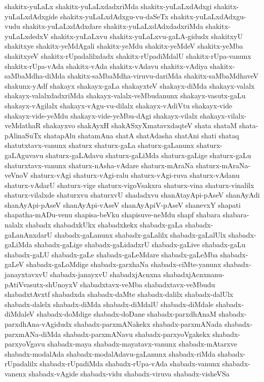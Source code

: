 {shakitx-yuLaLx
shakitx-yuLaLxdadxriMda
shakitx-yuLaLxdAdxgi
shakitx-yuLaLxdAdxgide
shakitx-yuLaLxdAdxgu-vu-daSeTx
shakitx-yuLaLxdAdxgu-vudu
shakitx-yuLaLxdAdxdare
shakitx-yuLaLxdAdxdadxriMda
shakitx-yuLaLxdedxV
shakitx-yuLaLxvu
shakitx-yuLaLxvu-gaLA-gidudx
shakitxyU
shakitxye
shakitx-yeMdAgali
shakitx-yeMdu
shakitx-yeMdeV
shakitx-yeMba
shakitxyeV
shakitx-rUpadalilxdadx
shakitx-rUpadiMdalU
shakitx-rUpa-vanunx
shakitx-rUpa-vAda
shakitx-vAda
shakitx-vAdavu
shakitx-vAdiya
shakitx-saMbaMdha-diMda
shakitx-saMbaMdha-viruvu-dariMda
shakitx-saMbaMdhaveV
shakunx-yAdf
shakayx
shakayx-gaLa
shakayxteV
shakayx-diMda
shakayx-valalx
shakayx-valalxdadxriMda
shakayx-valalx-veMbudanunx
shakayx-vasutx-gaLu
shakayx-vAgilalx
shakayx-vAgu-vu-dilalx
shakayx-vAdiVtu
shakayx-vide
shakayx-vide-yeMdu
shakayx-vide-yeMbu-dAgi
shakayx-vilalx
shakayx-vilalx-veMdathaR
shakayxvo
shakAyxH
shakASxyXmatavxdaqteV
shata
shataM
shata-pAlinaSuTx
shatapAlu
shatamAna
shatA
shatAdasha
shatAni
shati
shataq
shatutxtavx-vanunx
shaturx
shaturx-gaLa
shaturx-gaLanunx
shaturx-gaLAguvavu
shaturx-gaLAdavu
shaturx-gaLiMda
shaturx-gaLige
shaturx-gaLu
shaturxtavx-vanunx
shaturx-nAsha-vAdare
shaturx-mAraNa
shaturx-mAraNa-veVnoV
shaturx-vAgi
shaturx-vAgi-ralu
shaturx-vAgi-ruva
shaturx-vAdanu
shaturx-vAdarU
shaturx-vige
shaturx-vigoVsakxra
shaturx-vina
shaturx-vinalilx
shaturx-vilalxde
shaturxvu
shaturxvU
shadadxvu
shanAtayApi-pAseV
shanAyAdi
shanAyApi-pAseV
shanAyApi-vAseV
shanAyApiV-pAseV
shanevxY
shapati
shapatha-mADu-venu
shapisa-beVku
shapisuve-neMdu
shapf
shabara
shabara-nalalx
shabadx
shabadxkUkx
shabadxkekx
shabadx-gaLa
shabadx-gaLanAnxdarU
shabadx-gaLanunx
shabadx-gaLalilx
shabadx-gaLalUlx
shabadx-gaLiMda
shabadx-gaLige
shabadx-gaLidadxrU
shabadx-gaLive
shabadx-gaLu
shabadx-gaLU
shabadx-gaLe
shabadx-gaLeMdare
shabadx-gaLeMba
shabadx-gaLeV
shabadx-gaLoMdige
shabadx-garxhaNa
shabadx-ciMte-yanunx
shabadx-janayxtavxvU
shabadx-janayxvU
shabadxjAcnxna
shabadxjAcnxnanu-pAtiVvasutx-shUnoyxV
shabadxtavx-veMba
shabadxtavx-veMbudu
shabadxtAvxtf
shabadxda
shabadx-daMte
shabadx-dalilx
shabadx-dalUlx
shabadx-dalelx
shabadx-diMda
shabadx-diMdalU
shabadx-diMdale
shabadx-diMdaleV
shabadx-doMdige
shabadx-doDane
shabadx-parxdhAnaM
shabadx-parxdhAna-vAgidudx
shabadx-parxmANakekx
shabadx-parxmANada
shabadx-parxmANa-diMda
shabadx-parxmANavu
shabadx-parxyoVgakekx
shabadx-parxyoVgavu
shabadx-maya
shabadx-mayatavx-vanunx
shabadx-mAtarxve
shabadx-modalAda
shabadx-modalAdavu-gaLanunx
shabadx-riMda
shabadx-rUpadalilx
shabadx-rUpadiMda
shabadx-rUpa-vAda
shabadx-vanunx
shabadx-vanenx
shabadx-vAgide
shabadx-vidu
shabadx-viruva
shabadx-visheVSa
}
